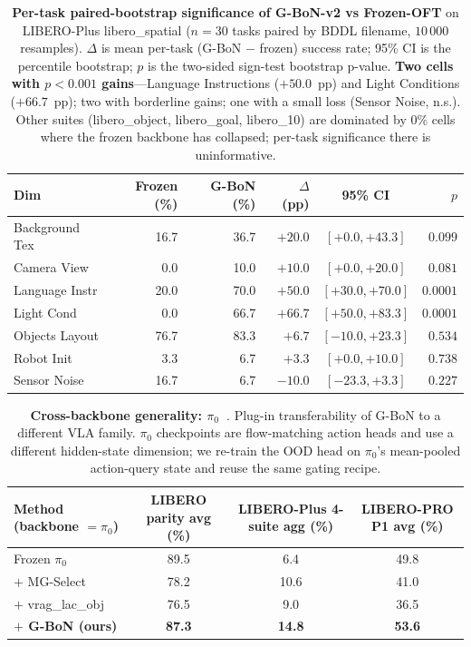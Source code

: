 \begin{table}[h]
\centering
\caption{\textbf{Per-task paired-bootstrap significance of G-BoN-v2 vs
Frozen-OFT} on LIBERO-Plus libero\_spatial ($n=30$ tasks paired by BDDL
filename, $10\,000$ resamples). $\Delta$ is mean per-task (G-BoN $-$ frozen)
success rate; 95\% CI is the percentile bootstrap; $p$ is the two-sided
sign-test bootstrap p-value. \textbf{Two cells with $p<0.001$
gains}---Language Instructions ($+50.0$~pp) and Light Conditions
($+66.7$~pp); two with borderline gains; one with a small loss
(Sensor Noise, n.s.). Other suites (libero\_object, libero\_goal,
libero\_10) are dominated by 0\% cells where the frozen backbone has
collapsed; per-task significance there is uninformative.}
\label{tab:abl_pvalues}
\begin{tabular}{lrrrcr}
\toprule
Dim & Frozen (\%) & G-BoN (\%) & $\Delta$ (pp) & 95\% CI & $p$ \\
\midrule
Background Tex   & 16.7 & 36.7 & $+20.0$            & $[+0.0,+43.3]$  & $0.099$ \\
Camera View      &  0.0 & 10.0 & $+10.0$            & $[+0.0,+20.0]$  & $0.081$ \\
Language Instr   & 20.0 & 70.0 & $\mathbf{+50.0}$   & $[+30.0,+70.0]$ & $\mathbf{0.0001}$ \\
Light Cond       &  0.0 & 66.7 & $\mathbf{+66.7}$   & $[+50.0,+83.3]$ & $\mathbf{0.0001}$ \\
Objects Layout   & 76.7 & 83.3 & $+6.7$             & $[-10.0,+23.3]$ & $0.534$ \\
Robot Init       &  3.3 &  6.7 & $+3.3$             & $[+0.0,+10.0]$  & $0.738$ \\
Sensor Noise     & 16.7 &  6.7 & $-10.0$            & $[-23.3,+3.3]$  & $0.227$ \\
\bottomrule
\end{tabular}
\end{table}

\begin{table}[h]
\centering
\caption{\textbf{Cross-backbone generality: $\pi_0$~\citep{pi02024}}.
Plug-in transferability of G-BoN to a different VLA family.
$\pi_0$ checkpoints are flow-matching action heads and use a different
hidden-state dimension; we re-train the OOD head on $\pi_0$'s
mean-pooled action-query state and reuse the same gating recipe.}
\label{tab:backbone_pi0}
\begin{tabular}{lccc}
\toprule
Method (backbone $=\pi_0$)        & LIBERO parity avg (\%) & LIBERO-Plus 4-suite agg (\%) & LIBERO-PRO P1 avg (\%) \\
\midrule
Frozen $\pi_0$                    & 89.5 &  6.4 & 49.8 \\
$+$ MG-Select \citep{mgselect2026}     & 78.2 & 10.6 & 41.0 \\
$+$ vrag\_lac\_obj                & 76.5 &  9.0 & 36.5 \\
\textbf{$+$ G-BoN (ours)}         & \textbf{87.3} & \textbf{14.8} & \textbf{53.6} \\
\bottomrule
\end{tabular}
\end{table}


